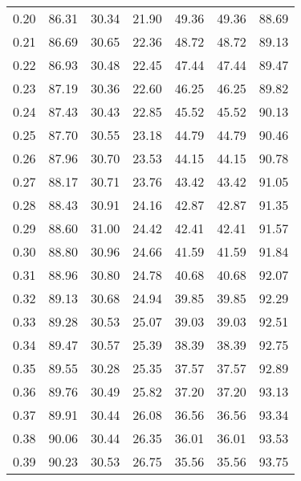 \begin{tabular}{|c|c|c|c|c|c|c|}
      0.20 &     86.31 &     30.34 &      21.90 &   49.36 &      49.36 &         88.69 \\
      0.21 &     86.69 &     30.65 &      22.36 &   48.72 &      48.72 &         89.13 \\
      0.22 &     86.93 &     30.48 &      22.45 &   47.44 &      47.44 &         89.47 \\
      0.23 &     87.19 &     30.36 &      22.60 &   46.25 &      46.25 &         89.82 \\
      0.24 &     87.43 &     30.43 &      22.85 &   45.52 &      45.52 &         90.13 \\
      0.25 &     87.70 &     30.55 &      23.18 &   44.79 &      44.79 &         90.46 \\
      0.26 &     87.96 &     30.70 &      23.53 &   44.15 &      44.15 &         90.78 \\
      0.27 &     88.17 &     30.71 &      23.76 &   43.42 &      43.42 &         91.05 \\
      0.28 &     88.43 &     30.91 &      24.16 &   42.87 &      42.87 &         91.35 \\
      0.29 &     88.60 &     31.00 &      24.42 &   42.41 &      42.41 &         91.57 \\
      0.30 &     88.80 &     30.96 &      24.66 &   41.59 &      41.59 &         91.84 \\
      0.31 &     88.96 &     30.80 &      24.78 &   40.68 &      40.68 &         92.07 \\
      0.32 &     89.13 &     30.68 &      24.94 &   39.85 &      39.85 &         92.29 \\
      0.33 &     89.28 &     30.53 &      25.07 &   39.03 &      39.03 &         92.51 \\
      0.34 &     89.47 &     30.57 &      25.39 &   38.39 &      38.39 &         92.75 \\
      0.35 &     89.55 &     30.28 &      25.35 &   37.57 &      37.57 &         92.89 \\
      0.36 &     89.76 &     30.49 &      25.82 &   37.20 &      37.20 &         93.13 \\
      0.37 &     89.91 &     30.44 &      26.08 &   36.56 &      36.56 &         93.34 \\
      0.38 &     90.06 &     30.44 &      26.35 &   36.01 &      36.01 &         93.53 \\
      0.39 &     90.23 &     30.53 &      26.75 &   35.56 &      35.56 &         93.75 \\

\end{tabular}
